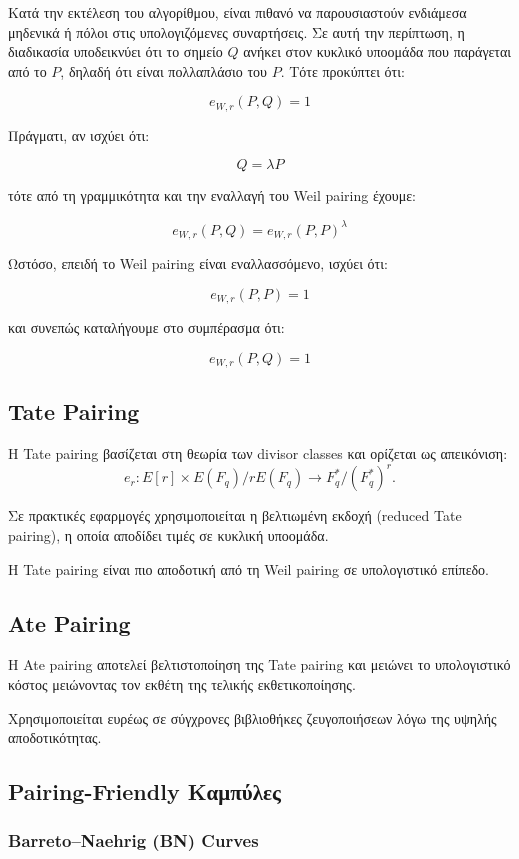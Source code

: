 \documentclass[12pt,a4paper]{report}
\begin{document}
Κατά την εκτέλεση του αλγορίθμου, είναι πιθανό να παρουσιαστούν ενδιάμεσα μηδενικά ή πόλοι στις υπολογιζόμενες συναρτήσεις. Σε αυτή την περίπτωση, η διαδικασία υποδεικνύει ότι το σημείο $Q$ ανήκει στον κυκλικό υποομάδα που παράγεται από το $P$, δηλαδή ότι είναι πολλαπλάσιο του $P$. Τότε προκύπτει ότι:

\[
e_{W,r}(P,Q) = 1
\]

Πράγματι, αν ισχύει ότι:

\[
Q = \lambda P
\]

τότε από τη γραμμικότητα και την εναλλαγή του Weil pairing έχουμε:

\[
e_{W,r}(P,Q) = e_{W,r}(P,P)^{\lambda}
\]

Ωστόσο, επειδή το Weil pairing είναι εναλλασσόμενο, ισχύει ότι:

\[
e_{W,r}(P,P) = 1
\]

και συνεπώς καταλήγουμε στο συμπέρασμα ότι:

\[
e_{W,r}(P,Q) = 1
\]


\subsection{Tate Pairing}

Η Tate pairing βασίζεται στη θεωρία των divisor classes και ορίζεται ως απεικόνιση:
\[
e_r: E[r] \times E(F_q)/rE(F_q) \rightarrow F_q^*/(F_q^*)^r.
\]

Σε πρακτικές εφαρμογές χρησιμοποιείται η βελτιωμένη εκδοχή (reduced Tate pairing), η οποία αποδίδει τιμές σε κυκλική υποομάδα.

Η Tate pairing είναι πιο αποδοτική από τη Weil pairing σε υπολογιστικό επίπεδο.

\subsection{Ate Pairing}

Η Ate pairing αποτελεί βελτιστοποίηση της Tate pairing και μειώνει το υπολογιστικό κόστος μειώνοντας τον εκθέτη της τελικής εκθετικοποίησης.

Χρησιμοποιείται ευρέως σε σύγχρονες βιβλιοθήκες ζευγοποιήσεων λόγω της υψηλής αποδοτικότητας.

\subsection{Pairing-Friendly Καμπύλες}

\subsubsection*{Barreto--Naehrig (BN) Curves}
\end{document}
